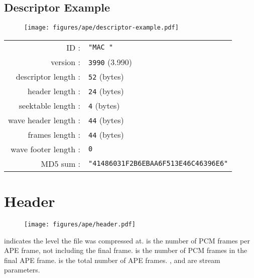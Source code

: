 \subsection{Descriptor Example}
\begin{figure}[h]
\texttt{[image: figures/ape/descriptor-example.pdf]}
\end{figure}
\begin{table}[h]
\begin{tabular}{rl}
ID : & \texttt{"MAC "} \\
version : & \texttt{3990} (3.990) \\
descriptor length : & \texttt{52} (bytes)\\
header length : & \texttt{24} (bytes)\\
seektable length : & \texttt{4} (bytes) \\
wave header length : & \texttt{44} (bytes) \\
frames length : & \texttt{44} (bytes) \\
wave footer length : & \texttt{0} \\
MD5 sum : & \texttt{"41486031F2B6EBAA6F513E46C46396E6"}
\end{tabular}
\end{table}

\clearpage

\section{Header}
\begin{figure}[h]
\texttt{[image: figures/ape/header.pdf]}
\end{figure}
\par
\noindent
{} indicates the level the file was compressed at.
 is the number of PCM frames per APE frame,
not including the final frame.
 is the number of PCM frames
in the final APE frame.
 is the total number of APE frames.
,  and 
are stream parameters.
